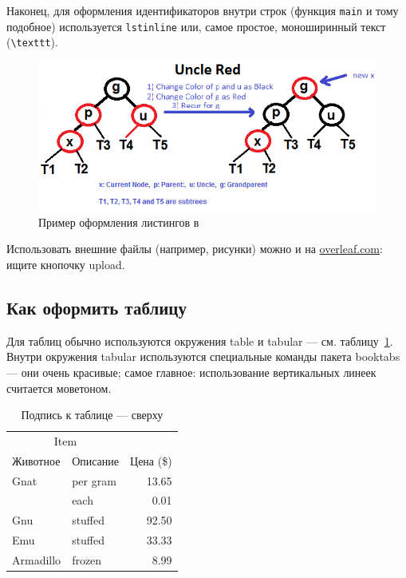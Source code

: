 Наконец, для оформления идентификаторов внутри строк
(функция \lstinline{main} и тому подобное) используется
\texttt{lstinline} или, самое простое, моноширинный текст
(\texttt{\textbackslash texttt}).

\begin{figure}[p]%
\centering
\includegraphics[width=\textwidth]{img/tan-aus.png}
\caption{\label{fig:tan-aus}Пример оформления листингов в~\autocite{TanAus2013}}
\end{figure}

Использовать внешние файлы (например, рисунки) можно и на \href{http://overleaf.com}{overleaf.com}: ищите кнопочку upload.

\subsection{Как оформить таблицу}

Для таблиц обычно используются окружения table и tabular --- см. таблицу~\ref{tab:widgets}. Внутри окружения tabular используются специальные команды пакета booktabs — они очень красивые; самое главное: использование вертикальных линеек считается моветоном.

\begin{table}
\centering
\caption{\label{tab:widgets}Подпись к таблице --- сверху}
\begin{tabular}{llr}
\toprule
\multicolumn{2}{c}{Item} \\
\cmidrule(r){1-2}
Животное  & Описание    & Цена (\$) \\
\midrule
Gnat      & per gram    & 13.65      \\
          & each        & 0.01       \\
Gnu       & stuffed     & 92.50      \\
Emu       & stuffed     & 33.33      \\
Armadillo & frozen      & 8.99       \\
\bottomrule
\end{tabular}
\end{table}


